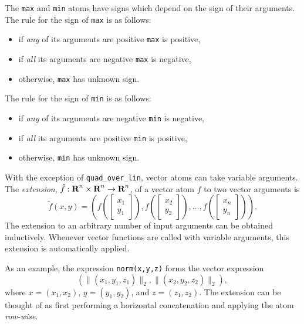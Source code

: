 \documentclass[11pt]{article}
\newcommand{\reals}{{\mbox{\bf R}}}
\begin{document}
The {\tt max} and {\tt min} atoms have signs which depend on the sign of their
arguments. The rule for the sign of {\tt max} is as follows:
\begin{itemize}
\item if \emph{any} of its arguments are positive {\tt max} is positive,
\item if \emph{all} its arguments are negative {\tt max} is negative,
\item otherwise, {\tt max} has unknown sign.
\end{itemize}
The rule for the sign of {\tt min} is as follows:
\begin{itemize}
\item if \emph{any} of its arguments are negative {\tt min} is negative,
\item if \emph{all} its arguments are positive {\tt min} is positive,
\item otherwise, {\tt min} has unknown sign.
\end{itemize}

With the exception of {\tt quad\_over\_lin}, vector atoms can take variable
arguments. The \emph{extension}, $\tilde f : \reals^n \times \reals^n \to
\reals^n$, of a vector atom $f$ to two vector arguments is
\[
\tilde f(x, y) = \left( f\left(\begin{bmatrix} x_1 \\ y_1 \end{bmatrix}\right), 
  f\left(\begin{bmatrix}x_2 \\ y_2 \end{bmatrix}\right), \ldots, 
  f\left(\begin{bmatrix}x_n \\ y_n\end{bmatrix}\right) \right).
\]
The extension to an arbitrary number of input arguments can be obtained inductively.
Whenever vector functions are called with variable arguments, this extension
is automatically applied.

As an example, the expression {\tt norm(x,y,z)} forms the vector expression
\[
\left(  
  \|(x_1,y_1,z_1)\|_2,
  \|(x_2, y_2, z_2)\|_2
\right),
\]
where $x = (x_1,x_2)$, $y = (y_1, y_2)$, and $z = (z_1, z_2)$. The extension
can be thought of as first performing a horizontal concatenation and applying
the atom \emph{row-wise}.
\end{document}
